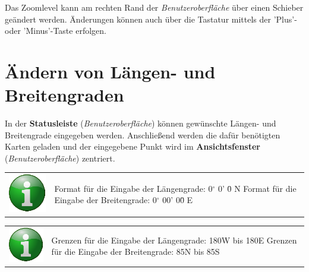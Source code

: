 \documentclass[10pt]{scrreprt}
\newcommand{\textref}[1]{\mbox{\raisebox{0.1ex}{\small$\rightarrow$ }\textit{#1}}}
\begin{document}
\vspace{3mm}
Das Zoomlevel kann am rechten Rand der \textref{Benutzeroberfläche} über einen Schieber geändert werden. Änderungen können auch über die Tastatur mittels der 'Plus'- oder 'Minus'-Taste erfolgen.







\vspace{3mm}
\section{Ändern von Längen- und Breitengraden}
 

In der \textbf{Statusleiste} (\textref{Benutzeroberfläche}) können gewünschte Längen- und Breitengrade eingegeben werden. Anschließend werden die dafür benötigten Karten geladen und der eingegebene Punkt wird im \textbf{Ansichtsfenster} (\textref{Benutzeroberfläche}) zentriert.

\vspace{3mm}
\begin{tabular}{>{\centering \arraybackslash}m{1cm} m{14cm}}
\includegraphics[scale=0.5]{images/info.eps} & \flushleft Format für die Eingabe der Längengrade: 0$^\circ$ 0' 0\"{} N \linebreak Format für die Eingabe der Breitengrade: 0$^\circ$ 00' 00\"{} E
\end{tabular}

\vspace{3mm}
\begin{tabular}{>{\centering \arraybackslash}m{1cm} m{14cm}}
\includegraphics[scale=0.5]{images/info.eps} & \flushleft Grenzen für die Eingabe der Längengrade: 180W bis 180E \linebreak Grenzen für die Eingabe der Breitengrade: 85N bis 85S
\end{tabular}
\end{document}
